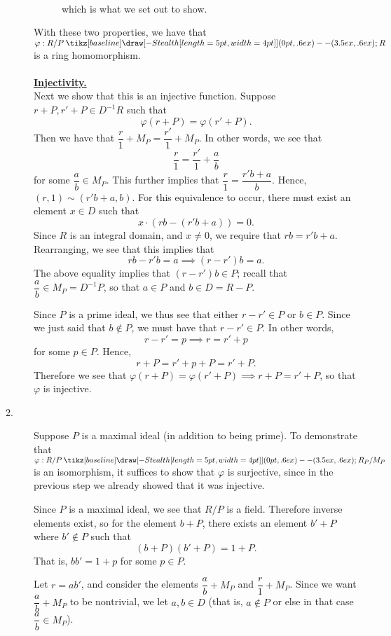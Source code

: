 \documentclass[12pt,letterpaper]{algebra_book}
\renewcommand{\to}{\mathbin{\tikz[baseline] \draw[-{Stealth[length=5pt,width=4pt]}] (0pt,.6ex) -- (3.5ex,.6ex);}}
\renewcommand{\phi}{\varphi}
\theoremstyle{definition}
\begin{document}
\begin{prf}
\begin{description}
\begin{description}
\begin{align*}
        \end{align*}
        which is what we set out to show. 
    \end{description}
    With these two properties, we have that $\phi: R/P \to
    R$ is a ring homomorphism.
    \\
    \\
    \underline{\textbf{Injectivity.}}\\
    Next we show that this is an injective function. Suppose $r +
    P,r' + P \in D^{-1}R$ such that 
    \[
        \phi(r + P)= \phi(r' + P).
    \]
    Then we have that $\dfrac{r}{1} + M_P = \dfrac{r'}{1} + M_P$. In
    other words, we see that 
    \[
        \frac{r}{1} = \frac{r'}{1} + \frac{a}{b}
    \]
    for some $\dfrac{a}{b} \in M_P$. This further implies that
    $\dfrac{r}{1} = \dfrac{r'b + a}{b}$. Hence, $(r, 1) \sim (r'b
    + a, b)$. For this equivalence to
    occur, there must exist an element $x \in D$ such that 
    \[
        x\cdot(rb - (r'b + a)) = 0.
    \]   
    Since $R$ is an integral domain, and $x \ne 0$, we require
    that $rb = r'b + a$. Rearranging, we see that this implies
    that 
    \[
        rb - r'b = a \implies (r - r')b = a.
    \]
    The above equality implies that $(r - r')b \in P$; recall that
    $\dfrac{a}{b} \in M_P = D^{-1}P$, so that $a \in P$
    and $b \in D = R - P$. 
    
    Since $P$ is a prime ideal, we thus see that either $r -
    r' \in P$ or $b \in P$. Since we just said that $b \not\in P$,
    we must have that $r - r' \in P.$ In other words, 
    \[
        r - r' = p \implies r = r' + p
    \]
    for some $p \in P$. Hence, 
    \[
        r + P = r' + p + P = r' + P.   
    \]
    Therefore we see that $\phi(r + P) = \phi(r' + P) \implies r +
    P = r' + P$, so that $\phi$ is injective.

    \item[2.] Suppose $P$ is a maximal ideal (in addition to being
    prime). To demonstrate that $\phi: R/P \to R_P/M_P$ is an
    isomorphism, it suffices to show that $\phi$ is surjective,
    since in the previous step we already showed that it was
    injective. 

    Since $P$ is a maximal ideal, we see
    that $R/P$ is a field. Therefore inverse elements exist, so
    for the element $b + P$, there exists an element $b' + P$
    where $b' \not\in P$ such that 
    \[
        (b + P)(b' + P) =  1 + P.
    \]
    That is, $bb' = 1 + p$ for some $p \in P$. 

    Let $r = ab'$, and consider the elements $\dfrac{a}{b} + M_P$
    and $\dfrac{r}{1} + M_P$. Since we want $\dfrac{a}{b} + M_P$
    to be nontrivial, we let $a, b \in D$ (that is, $a \not\in P$
    or else in that case $\dfrac{a}{b} \in M_P$).
    

\end{description}
\end{prf}
\end{document}
